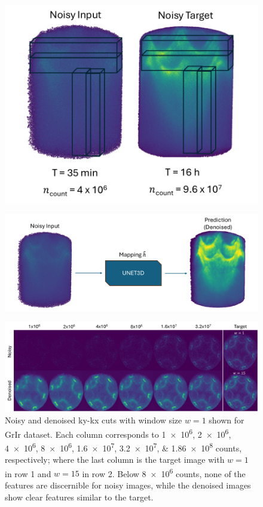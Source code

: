 \begin{figure}[h]
    \centering
    \includegraphics[width=0.5\linewidth]{images/training_3d_patch_example.pdf}
    \caption{}
\end{figure}

\begin{figure}[h]
    \centering
    \includegraphics[width=1\linewidth]{images/noisy_denoised_3d.pdf}
    \caption{}
\end{figure}


\begin{figure}[h]
    \centering
    \includegraphics[width=1\linewidth]{images/images_noisy_denoised_with_target.pdf}
    \caption{Noisy and denoised \gls{ky}-\gls{kx} cuts with window size $w=1$ shown for \gls{GrIr} dataset. Each column corresponds to \numlist{1e6;2e6;4e6;8e6;1.6e7;3.2e7;1.86e8} counts, respectively; where the last column is the target image with $w=1$ in row 1 and $w=15$ in row 2. Below \num{8e6} counts, none of the features are discernible for noisy images, while the denoised images show clear features similar to the target.}
    \label{fig:images-noisy-denoised-training}
\end{figure}


